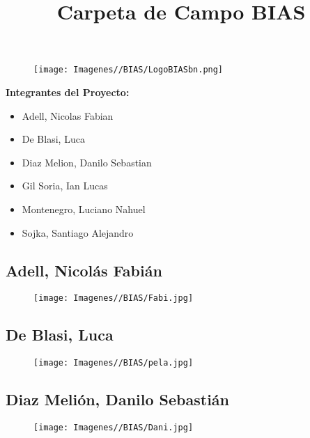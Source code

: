 \documentclass{article}
\title{Carpeta de Campo BIAS}
\date{}
\begin{document}
\begin{figure}
    \centering
    \texttt{[image: Imagenes//BIAS/LogoBIASbn.png]}
\end{figure}

\maketitle

\vspace{1cm} 

\textbf{Integrantes del Proyecto:} 

\begin{itemize}
    \item Adell, Nicolas Fabian
    \item De Blasi, Luca
    \item Diaz Melion, Danilo Sebastian
    \item Gil Soria, Ian Lucas
    \item Montenegro, Luciano Nahuel
    \item Sojka, Santiago Alejandro
\end{itemize}

\newpage


\subsection{Adell, Nicolás Fabián}

\begin{figure}[H]
    \texttt{[image: Imagenes//BIAS/Fabi.jpg]}
\end{figure}

\subsection{De Blasi, Luca}

\begin{figure}[H]
    \texttt{[image: Imagenes//BIAS/pela.jpg]}
\end{figure}

\subsection{Diaz Melión, Danilo Sebastián}

\begin{figure}[H]
    \texttt{[image: Imagenes//BIAS/Dani.jpg]}
\end{figure}
\end{document}
